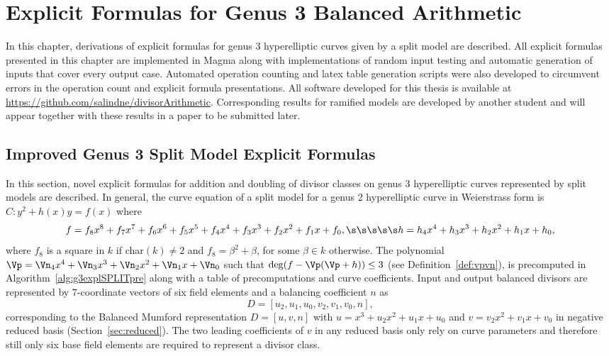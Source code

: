 
\chapter{Explicit Formulas for Genus 3 Balanced Arithmetic}\label{cha:g3} In
this chapter, derivations of explicit formulas for genus 3 hyperelliptic curves
given by a split model are described. 
All explicit formulas presented in this chapter are
implemented in Magma along with implementations of random input testing and
automatic generation of inputs that cover every output case. Automated operation
counting and latex table generation scripts were also developed to circumvent
errors in the operation count and explicit formula presentations. All software
developed for this thesis is available at
\url{https://github.com/salindne/divisorArithmetic}. Corresponding results for
ramified models are developed by another student and will appear together with
these results in a paper to be submitted later. 

\section{Improved Genus 3 Split Model Explicit Formulas}
In this section, novel explicit formulas for addition and doubling of divisor
classes on genus 3 hyperelliptic curves represented by split models are
described. In general, the curve equation of a split model for a genus 2
hyperelliptic curve in Weierstrass form is $C: y^2 + h(x)y = f(x)$ where
$$f = f_8x^8 + f_7x^7 + f_6x^6 + f_5x^5 + f_4x^4 + f_3x^3 + f_2 x^2 + f_1x +
f_0, \s\s\s\s\s h = h_4x^4 + h_3x^3 + h_2x^2 + h_1x + h_0,$$ where $f_8$ is a
square in $k$ if char$(k) \neq 2$ and $f_8 = \beta^2 + \beta$, for some $\beta
\in k$ otherwise. The polynomial $\Vp = \Vn_4x^4 + \Vn_3x^3 + \Vn_2x^2 + \Vn_1x
+ \Vn_0$ such that $\deg(f - \Vp(\Vp + h)) \leq 3$ (see
Definition~\ref{def:vpvn}), is precomputed in Algorithm~\ref{alg:g3explSPLITpre}
along with a table of precomputations and curve coefficients. Input and output
balanced divisors are represented by 7-coordinate vectors of six field elements
and a balancing coefficient $n$ as$$ D = [u_2,u_1,u_0,v_2,v_1,v_0,n],$$
corresponding to the Balanced Mumford representation $D = [u,v,n]$ with $u = x^3
+ u_2x^2 + u_1x + u_0$ and $v = v_2x^2 + v_1x + v_0$ in negative reduced basis
(Section~\ref{sec:reduced}).  The two leading coefficients of $v$ in any reduced
basis only rely on curve parameters and therefore still only six base field
elements are required to represent a divisor class. 


